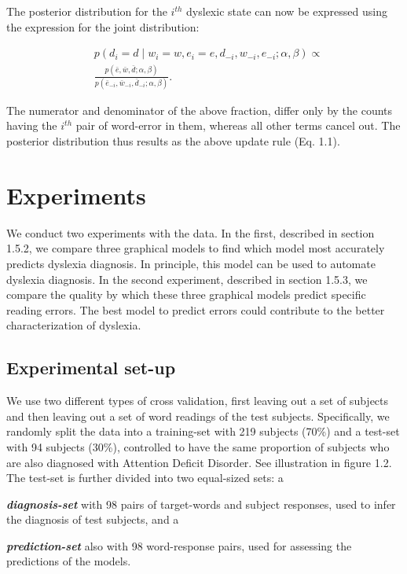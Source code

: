 {The posterior distribution for the $i^{th}$ dyslexic state can now be expressed using the expression for the joint distribution:

\begin{equation*}
\begin{split}
&p(d_i=d\mid w_i=w, e_i=e, d_{-i}, w_{-i}, e_{-i}; \alpha, \beta) \propto \\
&\frac{p(\bar{e},\bar{w},\bar{d};\alpha,\beta)}{p(\bar{e}_{-i},\bar{w}_{-i},\bar{d}_{-i};\alpha,\beta)}.
\end{split}
\end{equation*}

The numerator and denominator of the above fraction, differ only by the counts having the $i^{th}$ pair of word-error in them, whereas all other terms cancel out. The posterior distribution thus results as the above update rule (Eq. 1.1).

\section{Experiments}
We conduct two experiments with the data. In the first, described in section 1.5.2, we compare three graphical models to find which model most accurately predicts dyslexia diagnosis. In principle, this model can be used to automate dyslexia diagnosis. In the second experiment, described in section 1.5.3, we compare the quality by which these three graphical models predict specific reading errors. The best model to predict errors could contribute to the better characterization of dyslexia.

\subsection{Experimental set-up}
We use two different types of cross validation, first leaving out a set of subjects and then leaving out a set of word readings of the test subjects. Specifically, we randomly split the data into a training-set with 219 subjects (70\%) and a test-set with 94 subjects (30\%), controlled to have the same proportion of subjects who are also diagnosed with Attention Deficit Disorder. See illustration in figure 1.2. The test-set is further divided into two equal-sized sets: a {\textit {\textbf {diagnosis-set}} with 98 pairs of target-words and subject responses, used to infer the diagnosis of test subjects, and a {\textit {\textbf {prediction-set}} also with 98 word-response pairs, used for assessing the predictions of the models. 

}}}

